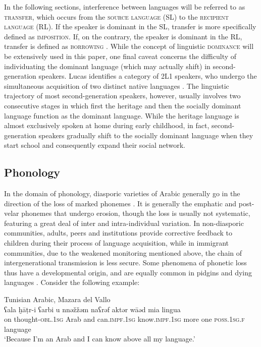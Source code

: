 \documentclass[output=paper]{langsci/langscibook}
\begin{document}
In the following sections, interference between languages will be referred to as \textsc{transfer}, which occurs from the \textsc{source} \textsc{language} (SL) to the \textsc{recipient} \textsc{language} (RL). If the speaker is dominant in the SL, transfer is more specifically defined as \textsc{imposition}. If, on the contrary, the speaker is dominant in the RL, transfer is defined as \textsc{borrowing} \citep{VanCoetsem1988, VanCoetsem2000,Lucas2015}. While the concept of linguistic \textsc{dominance} will be extensively used in this paper, one final caveat concerns the difficulty of individuating the dominant language (which may actually shift) in second-generation speakers. Lucas identifies a category of 2L1 speakers, who undergo the simultaneous acquisition of two distinct native languages \citep[525]{Lucas2015}. The linguistic trajectory of most second-generation speakers, however, usually involves two consecutive stages in which first the heritage and then the socially dominant language function as the dominant language. While the heritage language is almost exclusively spoken at home during early childhood, in fact, second-generation speakers gradually shift to the socially dominant language when they start school and consequently expand their social network.


 
 \subsection{Phonology}


In the domain of phonology, diasporic varieties of Arabic generally go in the direction of the loss of marked phonemes \citep[293]{Versteegh2014book}. It is generally the emphatic and post-velar phonemes that undergo erosion, though the loss is usually not systematic, featuring a great deal of inter and intra-individual variation. In non-diasporic communities, adults, peers and institutions provide corrective feedback to children during their process of language acquisition, while in immigrant communities, due to the weakened monitoring mentioned above, the chain of intergenerational transmission is less secure. Some phenomena of phonetic loss thus have a developmental origin, and are equally common in pidgins and dying languages \citep[372–373]{Romaine1989}. Consider the following example:

\ea\label{ex:key:maz}
{Tunisian Arabic, Mazara del Vallo \citep[85]{Danna2017book}}\\
\gll ʕala ḫāṭr-i ʕarbi u nnəžžəm naʕrəf aktər wāəd mia lingua\\
     on thought-\textsc{obl.1sg} Arab and can.\textsc{impf.1sg} know.\textsc{impf.1sg} more one \textsc{poss.1sg.f} language\\
\glt `Because I’m an Arab and I can know above all my language.'
\z
\end{document}
